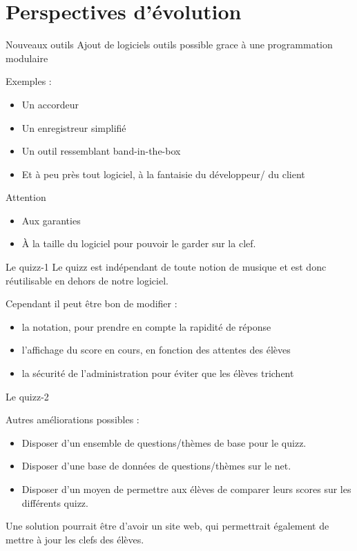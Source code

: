 \section{Perspectives d'évolution}

\begin{frame}
  \tableofcontents[currentsection]
\end{frame}
\begin{frame}{Nouveaux outils}
  Ajout de logiciels outils possible grace à une programmation modulaire
\begin{block}{Exemples : }
  \begin{itemize}
  \item Un accordeur
  \item Un enregistreur simplifié
  \item Un outil ressemblant band-in-the-box
  \item Et à peu près tout logiciel, à la fantaisie du développeur/ du client
  \end{itemize}
\end{block}
\begin{alertblock}{Attention}
  \begin{itemize}
  \item Aux garanties
  \item \`A la taille du logiciel pour pouvoir le garder sur la clef.
  \end{itemize}
\end{alertblock}
\end{frame}

\begin{frame}{Le quizz-1}
Le quizz est indépendant de toute notion de musique et est donc réutilisable en dehors de notre logiciel.\\
\begin{block}{Cependant il peut être bon de modifier :}
  \begin{itemize}
  \item la notation, pour prendre en compte la rapidité de réponse
  \item l'affichage du score en cours, en fonction des attentes des élèves
  \item la sécurité de l'administration pour éviter que les élèves trichent
  \end{itemize}
\end{block}
\end{frame}
\begin{frame}{Le quizz-2}
\begin{block}{Autres améliorations possibles : }
  \begin{itemize}
  \item Disposer d'un ensemble de questions/thèmes de base pour le quizz.
  \item Disposer d'une base de données de questions/thèmes sur le net.
  \item Disposer d'un moyen de permettre aux élèves de comparer leurs scores sur les différents quizz.
  \end{itemize}  
  Une solution pourrait être d'avoir un site web, qui permettrait également de mettre à jour les clefs des élèves.
\end{block}
\end{frame}

